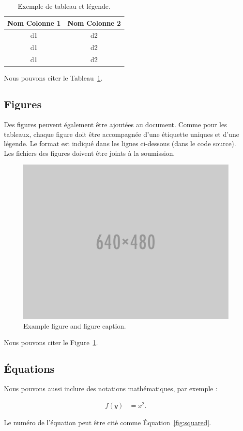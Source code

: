 \documentclass[fra]{anthology-ch}         %
\begin{document}
\begin{table}[h]
  \centering 
  \begin{tabular}{cc}
    \toprule
    Nom Colonne 1 & Nom Colonne 2\\
    \midrule
    d1 & d2 \\
    d1 & d2 \\
    d1 & d2 \\
    \bottomrule
  \end{tabular}
  \caption{Exemple de tableau et légende.}
  \label{tab:example}
\end{table}

Nous pouvons citer le Tableau~\ref{tab:example}.

\subsection{Figures}

Des figures peuvent également être ajoutées au document. Comme pour les
tableaux, chaque figure doit être accompagnée d'une étiquette uniques et
d'une légende. Le format est indiqué dans les lignes ci-dessous
(dans le code source). Les fichiers des figures doivent être joints à la
soumission.

\begin{figure}[t!]
  \centering
  \includegraphics[width=0.4\linewidth]{640x480.png}
  \caption{Example figure and figure caption.}
  \label{fig:example}
\end{figure}

Nous pouvons citer le Figure~\ref{fig:example}.

\subsection{Équations}

Nous pouvons aussi inclure des notations mathématiques, par exemple :

\begin{align}
f(y) &= x^2. \label{fig:squared}
\end{align}

Le numéro de l'équation peut être cité comme Équation~\ref{fig:squared}.
\end{document}

